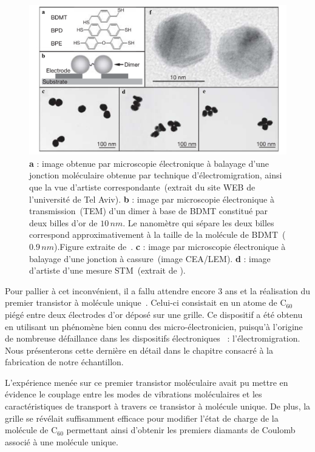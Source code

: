 \begin{figure}
\centering \includegraphics[scale=0.45]{Spintronique/MolSpintro2/MolSpintro2.pdf}
\caption{\textbf{a} : image obtenue par microscopie électronique à balayage d'une jonction moléculaire obtenue par technique d'électromigration, ainsi que la vue d'artiste correspondante~(extrait du site WEB de l'université de Tel Aviv). \textbf{b} : image par microscopie électronique à transmission~(TEM) d'un dimer à base de BDMT constitué par deux billes d'or de $10\,nm$. Le nanomètre qui sépare les deux billes correspond approximativement à la taille de la molécule de BDMT~($0.9\,nm$).Figure extraite de~\cite{Dadosh2005}. \textbf{c} : image par microscopie électronique à balayage d'une jonction à cassure~(image CEA/LEM). \textbf{d} : image d'artiste d'une mesure STM~(extrait de \cite{Leary2011}).}
\label{MolSpintro2}
\end{figure}


Pour pallier à cet inconvénient, il a fallu attendre encore 3 ans et la réalisation du premier transistor à molécule unique~\cite{Park2000}. Celui-ci consistait en un atome de C$_{60}$ piégé entre deux électrodes d'or déposé sur une grille. Ce dispositif a été obtenu en utilisant un phénomène bien connu des micro-électronicien, puisqu'à l'origine de nombreuse défaillance dans les dispositifs électroniques~\cite{Ho1989,Tu1992} : l'électromigration. Nous présenterons cette dernière en détail dans le chapitre consacré à la fabrication de notre échantillon.

L'expérience menée sur ce premier transistor moléculaire avait pu mettre en évidence le couplage entre les modes de vibrations moléculaires et les caractéristiques de transport à travers ce transistor à molécule unique. De plus, la grille se révélait suffisamment efficace pour modifier l'état de charge de la molécule de C$_{60}$ permettant ainsi d'obtenir les premiers diamants de Coulomb associé à une molécule unique.

